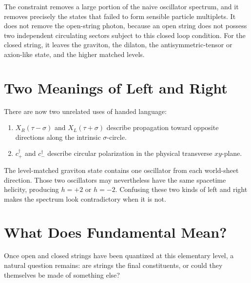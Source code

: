The constraint removes a large portion of the naive oscillator spectrum, and
it removes precisely the states that failed to form sensible particle
multiplets. It does not remove the open-string photon, because an open string
does not possess two independent circulating sectors subject to this closed
loop condition. For the closed string, it leaves the graviton, the dilaton,
the antisymmetric-tensor or axion-like state, and the higher matched levels.

\section{Two Meanings of Left and Right}

There are now two unrelated uses of handed language:
\begin{enumerate}
  \item \(X_R(\tau-\sigma)\) and \(X_L(\tau+\sigma)\) describe propagation
  toward opposite directions along the intrinsic \(\sigma\)-circle.
  \item \(c_+^\dagger\) and \(c_-^\dagger\) describe circular polarization in
  the physical transverse \(xy\)-plane.
\end{enumerate}
The level-matched graviton state contains one oscillator from each
world-sheet direction. Those two oscillators may nevertheless have the same
spacetime helicity, producing \(h=+2\) or \(h=-2\). Confusing these two kinds
of left and right makes the spectrum look contradictory when it is not.

\section{What Does Fundamental Mean?}

Once open and closed strings have been quantized at this elementary level, a
natural question remains: are strings the final constituents, or could they
themselves be made of something else?

\begin{classroomqa}
\end{classroomqa}

